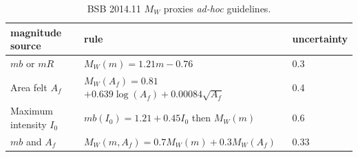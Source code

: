 \documentclass[draft, grl]{agutex}
\begin{document}
\begin{table}[H]
	\caption{BSB 2014.11 $M_W$ proxies \emph{ad-hoc} guidelines.}
	\begin{tabular}{l l l}
		\hline
		\textbf{magnitude source} & \textbf{rule} & \textbf{uncertainty}\\
		\hline
		$mb$ or $mR$ 
		&$ M_W(m) = 1.21 m - 0.76 $  
		& 0.3 \\
		Area felt $A_f$ 	
		&$ M_W(A_f) = 0.81 $$    + 0.639\log(A_f) + 0.00084\sqrt{A_f}$& 0.4 \\
		Maximum intensity $I_0$ 	
		& $mb(I_0) = 1.21 + 0.45 I_0$ then $M_W(m)$
		& 0.6 \\
		$mb$ and $A_f$ 	
		& $M_W(m, A_f) = 0.7 M_W(m) + 0.3 M_W(A_f)$
		& 0.33 \\
		\hline
	\end{tabular}
	\label{tab:guidelines}
\end{table}
\end{document}
